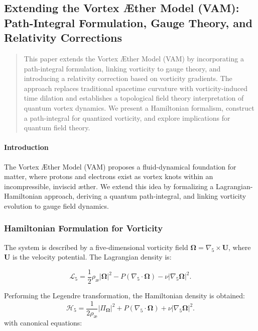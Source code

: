 \subsection{Extending the Vortex Æther Model (VAM): Path-Integral Formulation, Gauge Theory, and Relativity Corrections}\label{sec:extending-the-vortex-ther-model-(vam):-path-integral-formulation-gauge-theory-and-relativity-corrections}


\begin{abstract}
This paper extends the Vortex Æther Model (VAM) by incorporating a path-integral formulation, linking vorticity to gauge theory, and introducing a relativity correction based on vorticity gradients.
The approach replaces traditional spacetime curvature with vorticity-induced time dilation and establishes a topological field theory interpretation of quantum vortex dynamics.
We present a Hamiltonian formalism, construct a path-integral for quantized vorticity, and explore implications for quantum field theory.
\end{abstract}

\paragraph*{Introduction}
The Vortex Æther Model (VAM) proposes a fluid-dynamical foundation for matter, where protons and electrons exist as vortex knots within an incompressible, inviscid æther.
We extend this idea by formalizing a Lagrangian-Hamiltonian approach, deriving a quantum path-integral, and linking vorticity evolution to gauge field dynamics.

\subsubsection*{Hamiltonian Formulation for Vorticity}
The system is described by a five-dimensional vorticity field $\boldsymbol{\Omega} = \nabla_5 \times \mathbf{U}$, where $\mathbf{U}$ is the velocity potential. The Lagrangian density is:

\begin{equation}
    \mathcal{L}_5 = \frac{1}{2} \rho_{\text{æ}} |\boldsymbol{\Omega}|^2 - P (\nabla_5 \cdot \boldsymbol{\Omega}) - \nu |\nabla_5 \boldsymbol{\Omega}|^2.
\end{equation}

Performing the Legendre transformation, the Hamiltonian density is obtained:
\begin{equation}
    \mathcal{H}_5 = \frac{1}{2 \rho_{\text{æ}}} |\Pi_{\boldsymbol{\Omega}}|^2 + P (\nabla_5 \cdot \boldsymbol{\Omega}) + \nu |\nabla_5 \boldsymbol{\Omega}|^2.
\end{equation}
with canonical equations:

